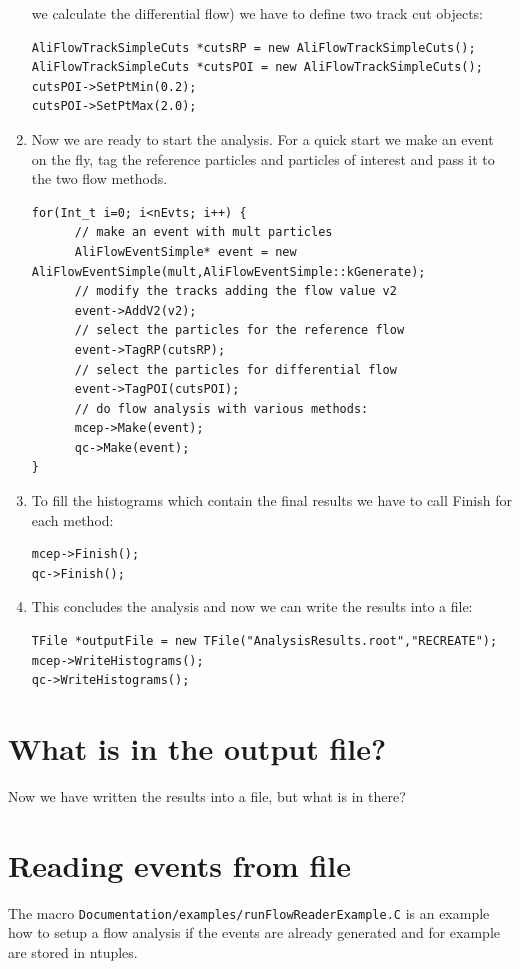 \documentclass[a5paper]{book}
\numberwithin{equation}{subsection}
\begin{document}
\begin{enumerate}
	we calculate the differential flow) we have to define two track cut objects:
	\begin{lstlisting}
AliFlowTrackSimpleCuts *cutsRP = new AliFlowTrackSimpleCuts();
AliFlowTrackSimpleCuts *cutsPOI = new AliFlowTrackSimpleCuts();
cutsPOI->SetPtMin(0.2);
cutsPOI->SetPtMax(2.0);	\end{lstlisting}
	\item Now we are ready to start the analysis. For a quick start we make an event on the fly, tag the reference particles and particles of interest  and pass it to the two flow methods. \\
	\begin{lstlisting}
for(Int_t i=0; i<nEvts; i++) { 
      // make an event with mult particles 
      AliFlowEventSimple* event = new AliFlowEventSimple(mult,AliFlowEventSimple::kGenerate);
      // modify the tracks adding the flow value v2
      event->AddV2(v2);
      // select the particles for the reference flow
      event->TagRP(cutsRP);
      // select the particles for differential flow
      event->TagPOI(cutsPOI);
      // do flow analysis with various methods:
      mcep->Make(event);
      qc->Make(event);
}\end{lstlisting}
	\item To fill the histograms which contain the final results we have to call Finish for each method:
	\begin{lstlisting}
mcep->Finish(); 
qc->Finish(); \end{lstlisting}
	\item This concludes the analysis and now we can write the results into a file:
	\begin{lstlisting}
TFile *outputFile = new TFile("AnalysisResults.root","RECREATE");
mcep->WriteHistograms();
qc->WriteHistograms();\end{lstlisting}
\end{enumerate}

\section{What is in the output file?}
Now we have written the results into a file, but what is in there?

\section{Reading events from file}
The macro \texttt{Documentation/examples/runFlowReaderExample.C} is an example how to setup a flow analysis if the events are already generated and
for example are stored in ntuples.
 
\end{document}
